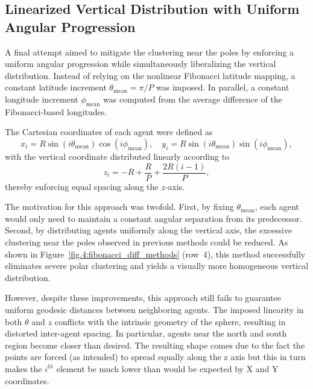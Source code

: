 \subsection{Linearized Vertical Distribution with Uniform Angular Progression}
A final attempt aimed to mitigate the clustering near the poles by enforcing a uniform angular progression while simultaneously liberalizing the vertical distribution. Instead of relying on the nonlinear Fibonacci latitude mapping, a constant latitude increment $\theta_{\text{mean}} = \pi / P$ was imposed. In parallel, a constant longitude increment $\phi_{\text{mean}}$ was computed from the average difference of the Fibonacci-based longitudes.

The Cartesian coordinates of each agent were defined as
\begin{equation}
x_i = R \sin(i\theta_{\text{mean}})\cos(i\phi_{\text{mean}}), \quad
y_i = R \sin(i\theta_{\text{mean}})\sin(i\phi_{\text{mean}}),
\end{equation}
with the vertical coordinate distributed linearly according to
\begin{equation}
z_i = -R + \frac{R}{P} + \frac{2R(i-1)}{P},
\end{equation}
thereby enforcing equal spacing along the $z$-axis.

The motivation for this approach was twofold. First, by fixing $\theta_{\text{mean}}$, each agent would only need to maintain a constant angular separation from its predecessor. Second, by distributing agents uniformly along the vertical axis, the excessive clustering near the poles observed in previous methods could be reduced. As shown in Figure~\ref{fig.4:fibonacci_diff_methods} (row~4), this method successfully eliminates severe polar clustering and yields a visually more homogeneous vertical distribution.

However, despite these improvements, this approach still fails to guarantee uniform geodesic distances between neighboring agents. The imposed linearity in both $\theta$ and $z$ conflicts with the intrinsic geometry of the sphere, resulting in distorted inter-agent spacing. In particular, agents near the north and south region become closer than desired. The resulting shape comes due to the fact the points are forced (as intended) to spread equally along the z axis but this in turn makes the $i^{th}$ element be much lower than would be expected by X and Y coordinates.

